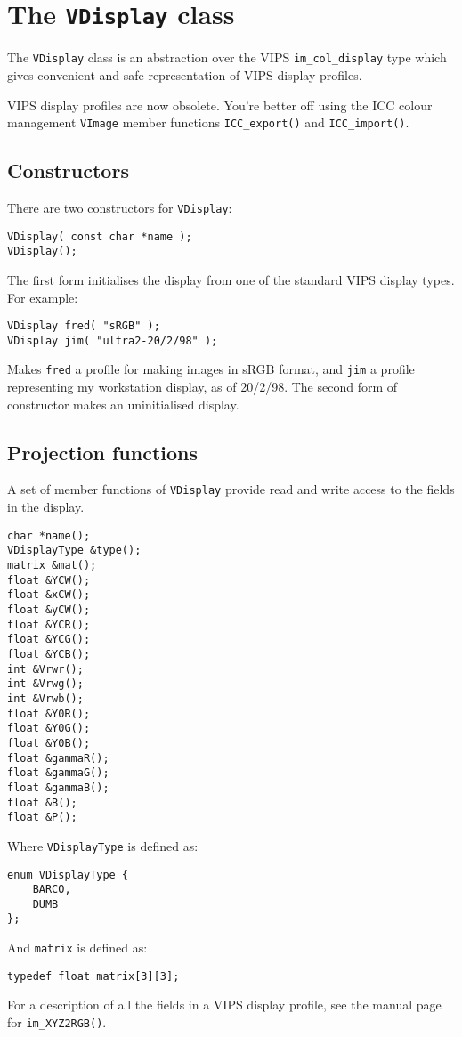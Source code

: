 \section{The \texttt{VDisplay} class}

The \verb+VDisplay+ class is an abstraction over the VIPS \verb+im_col_display+
type which gives convenient and safe representation of VIPS display profiles.

VIPS display profiles are now obsolete. You're better off using the
ICC colour management \verb+VImage+ member functions \verb+ICC_export()+ and 
\verb+ICC_import()+.

\subsection{Constructors}

There are two constructors for \verb+VDisplay+:

\begin{verbatim}
VDisplay( const char *name );
VDisplay();
\end{verbatim}

The first form initialises the display from one of the standard VIPS display
types. For example:

\begin{verbatim}
VDisplay fred( "sRGB" );
VDisplay jim( "ultra2-20/2/98" );
\end{verbatim}

Makes \verb+fred+ a profile for making images in sRGB format, and \verb+jim+ a
profile representing my workstation display, as of 20/2/98.  The second form
of constructor makes an uninitialised display.

\subsection{Projection functions}

A set of member functions of \verb+VDisplay+ provide read and write access to
the fields in the display.

\begin{verbatim}
char *name();
VDisplayType &type();
matrix &mat();
float &YCW();
float &xCW();
float &yCW();
float &YCR();
float &YCG();
float &YCB();
int &Vrwr();
int &Vrwg();
int &Vrwb();
float &Y0R();
float &Y0G();
float &Y0B();
float &gammaR();
float &gammaG();
float &gammaB();
float &B();
float &P();
\end{verbatim}

Where \verb+VDisplayType+ is defined as:

\begin{verbatim}
enum VDisplayType {
    BARCO,
    DUMB
};
\end{verbatim}

And \verb+matrix+ is defined as:

\begin{verbatim}
typedef float matrix[3][3];
\end{verbatim}

For a description of all the fields in a VIPS display profile, see the manual
page for \verb+im_XYZ2RGB()+.
